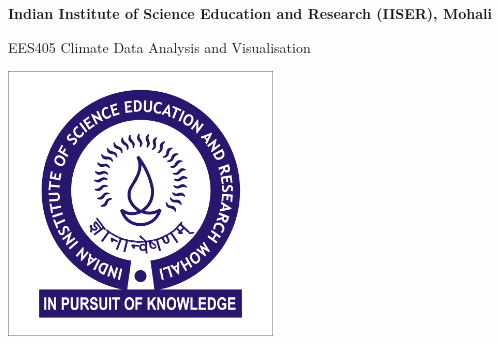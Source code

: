 \begin{center} \vfill
\thispagestyle{empty}
\textbf{\Large Indian Institute of Science Education and Research (IISER), Mohali}

{\large EES405 Climate Data Analysis and Visualisation

\Coursecode

\Semester} \vfill

\includegraphics[width=70mm]{pics/HighResolutionLogo.jpg} \vfill

\emph{\Large \thetitle} \vfill

{\large \theauthor} \vfill

\end{center} \clearpage
